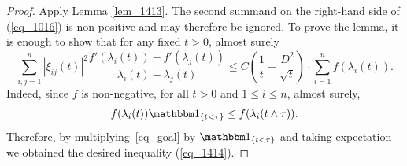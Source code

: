 \documentclass[12pt,a4paper]{article}
\theoremstyle{definition}
\begin{document}
\begin{proof} Apply Lemma \ref{lem_1413}.
The second summand on the right-hand side of (\ref{eq_1016}) is non-positive and may therefore be ignored. 
To prove the lemma, it is enough to show that for any fixed $t > 0$, almost surely
\begin{equation}\label{eq_goal}
\sum_{i,j=1}^n
|\xi_{ij}(t)|^2 \frac{f'(\lambda_i (t)) - f'(\lambda_j(t))}
{\lambda_i (t) - \lambda_j (t)}
\leq C \left( \frac 1t + \frac{D^2}{\sqrt{t}} \right) \cdot \sum_{i=1}^n
f(\lambda_i(t)).
\end{equation}
Indeed, since $f$ is non-negative, for all $t > 0$ and $1 \leq i \leq n$, almost surely,
\[
f ( \lambda_i (t) ) \mathbbm 1_{\{t<\tau\}} \leq f( \lambda_i (t\wedge \tau) ). 
\]
Therefore, by multiplying~\eqref{eq_goal}
by $\mathbbm 1_{\{t < \tau\}}$ and taking expectation we obtained the desired inequality (\ref{eq_1414}).


\end{proof}
\end{document}
